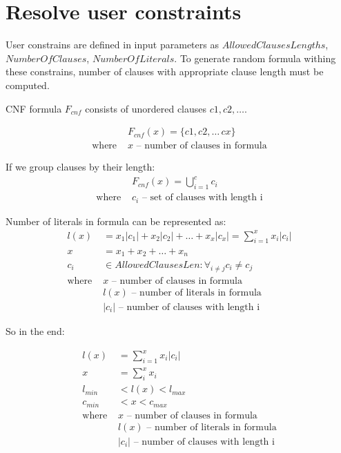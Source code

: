 \section{Resolve user constraints}
\label{sec:ResolveUserConstrains}

User constrains are defined in input parameters as $AllowedClausesLengths$, $NumberOfClauses$, $NumberOfLiterals$. To generate random formula withing these constrains, number of clauses with appropriate clause length must be computed.

CNF formula $F_{cnf}$ consists of unordered clauses $c1, c2, \dots$. 

\begin{align*}
	&F_{cnf}(x) = \{c1, c2, \dots\, cx\} \\
	\text{where }
		&x \text{ -- number of clauses in formula}
\end{align*}

If we group clauses by their length:
\begin{align*}
	&F_{cnf}(x) = \bigcup_{i=1}^c c_i \\
	\text{where }
		&c_i \text{ -- set of clauses with length i} 
\end{align*}

Number of literals in formula can be represented as:
\begin{align*}
	l(x) &= x_1|c_1| + x_2|c_2| + \dots + x_x|c_x| = \sum_{i=1}^{x} x_i |c_i| \\
	x &= x_1 + x_2 + \dots + x_n \\
	c_i &\in AllowedClausesLen: \forall_{i \neq j} c_i \neq c_j  \\
	\text{where }
		&x \text{ -- number of clauses in formula} \\ 
		&l(x) \text{ -- number of literals in formula} \\ 
		&|c_i| \text{ -- number of clauses with length i} 
\end{align*}

So in the end:

\begin{align}
	l(x) &= \sum_{i=1}^{x} x_i |c_i| \\
	x &= \sum_i^x x_i \\
	l_{min} &< l(x) < l_{max} \\
	c_{min} &< x < c_{max} \\
	\text{where } 
		&x \text{ -- number of clauses in formula} \nonumber \\
		&l(x) \text{ -- number of literals in formula} \nonumber  \\
		&|c_i| \text{ -- number of clauses with length i} \nonumber
\end{align}

